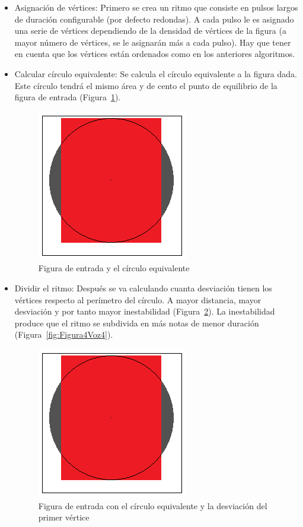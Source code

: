 \begin{itemize}
	\item Asignación de vértices: Primero se crea un ritmo que consiste en pulsos largos de duración configurable (por defecto redondas). A cada pulso le es asignado una serie de vértices dependiendo de la densidad de vértices de la figura (a mayor número de vértices, se le asignarán más a cada pulso). Hay que tener en cuenta que los vértices están ordenados como en los anteriores algoritmos.

	\item Calcular círculo equivalente: Se calcula el círculo equivalente a la figura dada. Este círculo tendrá el mismo área y de cento el punto de equilibrio de la figura de entrada (Figura~\ref{fig:Figura2Voz4}).
		
		\begin{figure}[htbp]
		\centering
		\hspace*{0.0in}
		\includegraphics[scale=1]{graphics/simpletest2-Circulo.png}
		\caption{Figura de entrada y el círculo equivalente}
		\label{fig:Figura2Voz4}
		\end{figure}

	\item Dividir el ritmo: Después se va calculando cuanta desviación tienen los vértices respecto al perímetro del círculo. A mayor distancia, mayor desviación y por tanto mayor inestabilidad (Figura~\ref{fig:Figura3Voz4}). La inestabilidad produce que el ritmo se subdivida en más notas de menor duración (Figura~\ref{fig:Figura4Voz4}).

		\begin{figure}[htbp]
		\centering
		\hspace*{0.0in}
		\includegraphics[scale=1]{graphics/simpletest2-Circulo.png}
		\caption{Figura de entrada con el círculo equivalente y la desviación del primer vértice}
		\label{fig:Figura3Voz4}
		\end{figure}


\end{itemize}
